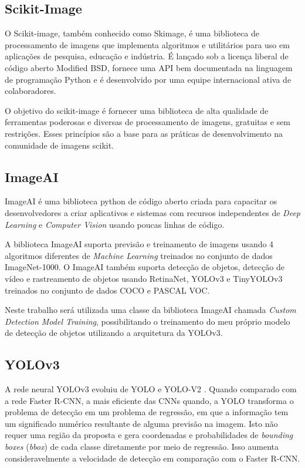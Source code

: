 \subsection{Scikit-Image}

O Scikit-image, também conhecido como Skimage, é uma biblioteca de processamento de imagens que implementa algoritmos e utilitários para uso em aplicações de pesquisa, educação e indústria. É lançado sob a licença liberal de código aberto Modified BSD, fornece uma API bem documentada na linguagem de programação Python e é desenvolvido por uma equipe internacional ativa de colaboradores.

O objetivo do scikit-image é fornecer uma biblioteca de alta qualidade de ferramentas poderosas e diversas de processamento de imagens, gratuitas e sem restrições. Esses princípios são a base para as práticas de desenvolvimento na comunidade de imagens scikit.\cite{skimage}

\subsection{ImageAI}

ImageAI é uma biblioteca python de código aberto criada para capacitar os desenvolvedores a criar aplicativos e sistemas com recursos independentes de \textit{Deep Learning} e \textit{Computer Vision} usando poucas linhas de código.

A biblioteca ImageAI suporta previsão e treinamento de imagens usando 4 algoritmos diferentes de \textit{Machine Learning} treinados no conjunto de dados ImageNet-1000. O ImageAI também suporta detecção de objetos, detecção de vídeo e rastreamento de objetos usando RetinaNet, YOLOv3 e TinyYOLOv3 treinados no conjunto de dados COCO e PASCAL VOC.\cite{ImageAI}

Neste trabalho será utilizada uma classe da biblioteca ImageAI chamada \textit{Custom Detection Model Training}, possibilitando o treinamento do meu próprio modelo de detecção de objetos utilizando a arquitetura da YOLOv3.

\subsection{YOLOv3}

A rede neural YOLOv3 evoluiu de YOLO e YOLO-V2 \cite{redmon2018yolov3}. Quando comparado com a rede Faster R-CNN, a mais eficiente das CNNs quando, a YOLO transforma o problema de detecção em um problema de regressão, em que a informação tem um significado numérico resultante de alguma previsão na imagem. Isto não requer uma região da proposta e gera coordenadas e probabilidades de \textit{bounding boxes} (\textit{bbox}) de cada classe diretamente por meio de regressão. Isso aumenta consideravelmente a velocidade de detecção em comparação com o Faster R-CNN.\cite{yolov3_apple}

